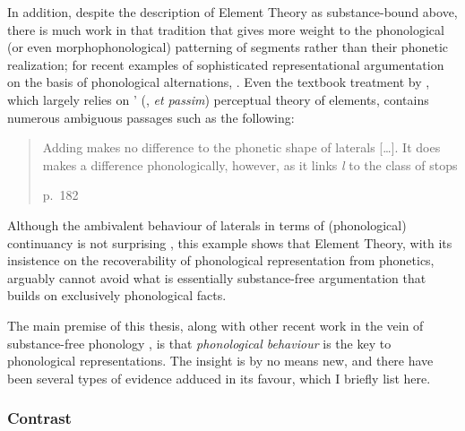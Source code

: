 In addition, despite the description of Element Theory as substance\hyp bound above, there is much work in that tradition that gives more weight to the phonological (or even morphophonological) patterning of segments rather than their phonetic realization; for recent examples of sophisticated representational argumentation on the basis of phonological alternations, \cf \citet{gussmann07,cyran10:_compl}. Even the textbook treatment by \citet{backley11:_elemen_theor}, which largely relies on \citeauthor{harris94:_englis}' (\citeyear{harris94:_englis}, \emph{et passim}) perceptual theory of elements, contains numerous ambiguous passages such as the following: \blockquote[p.~182][.]{Adding  makes no difference to the phonetic shape of laterals [\ldots]. It does makes a difference phonologically, however, as it links \emph{l} to the class of stops} Although the ambivalent behaviour of laterals in terms of (phonological) continuancy is not surprising \citep{mielke05:_ambiv}, this example shows that Element Theory, with its insistence on the recoverability of phonological representation from phonetics, arguably cannot avoid what is essentially substance\hyp free argumentation that builds on exclusively phonological facts.

The main premise of this thesis, along with other recent work in the vein of substance\hyp free phonology \citep{moren-serbian,moren-foa,blaho-diss,youssef10:_laryn_buchan_scots,uffmann10,iosaded:_final_italy,iosad10:_motiv}, is that \emph{phonological behaviour} is the key to phonological representations. The insight is by no means new, and there have been several types of evidence adduced in its favour, which I briefly list here.

\subsubsection{Contrast}
\label{sec:contrast}

